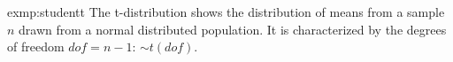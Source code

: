 \pagebreak
\begin{exmp}{exmp:studentt}
	The t-distribution shows the distribution of means from a sample $n$ drawn from a normal distributed population. It is characterized by the degrees of freedom $dof=n-1$: $\sim t(dof)$.
		
\end{exmp}
\pagebreak
